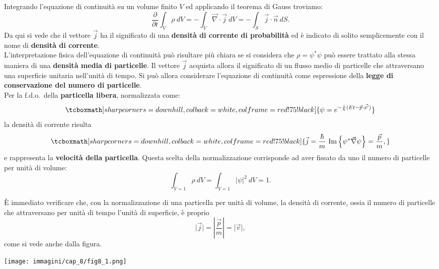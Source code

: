 \documentclass[a4paper,12pt,oneside]{book}
\begin{document}
Integrando l'equazione di continuità su un volume finito $V$ ed applicando il teorema di Gauss troviamo:
\begin{equation}
\frac{\partial }{\partial t} \int _V \rho\ dV = - \int _V \vec{\nabla}\cdot\vec{j}\ dV = -\int _S \vec{j}\cdot\vec{n}\ dS.
\end{equation}
Da qui si vede che il vettore $\vec{j}$ ha il significato di una \textbf{densità di corrente di probabilità} ed è indicato di solito semplicemente con il nome di \textbf{densità di corrente}.\\

L'interpretazione fisica dell'equazione di continuità può risultare più chiara se si considera che $\rho= \psi^* \psi$ può essere trattato alla stessa maniera di una \textbf{densità media di particelle}. Il vettore $\vec{j}$ acquista allora il significato di un flusso medio di particelle che attraversano una superficie unitaria nell'unità di tempo. Si può allora considerare l'equazione di continuità come espressione della \textbf{legge di conservazione del numero di particelle}.\\

Per la f.d.o.~della \textbf{particella libera}, normalizzata come:
	\begin{equation}
		\tcboxmath[sharp corners=downhill, colback=white, colframe=red!75!black]{
			\psi  =  e^{-\frac{i}{\hbar} (Et - \vec{p}\cdot \vec{x'})}
			}
	\end{equation}
la densità di corrente risulta
	\begin{equation}
		\tcboxmath[sharp corners=downhill, colback=white, colframe=red!75!black]{
			\vec{j}= \frac{\hbar}{m}\ \textrm{Im}\left\{\psi ^* \vec{\nabla}\psi \right\}= \frac{\vec{p}}{m},
			}
	\end{equation}
e rappresenta la \textbf{velocità della particella}. Questa scelta della normalizzazione corrisponde ad aver fissato da uno il numero di particelle per unità di volume:
	\begin{equation}
		\int _{V=1} \rho \ dV = \int _{V=1} \vert \psi \vert ^2 \ dV=1.
	\end{equation}
\begin{center}
\begin{tcolorbox}[toprule=3mm, width=.9\textwidth, colback=white]
È immediato verificare che, con la normalizzazione di una particella per unità di volume, la densità di corrente, ossia il numero di particelle che attraversano per unità di tempo l'unità di superficie, è proprio
\begin{equation}
\vert \vec{j} \vert= \left\vert \frac{\vec{p}}{m} \right\vert =\vert \vec{v} \vert ,
\end{equation}
come si vede anche dalla figura.
\begin{center}
\texttt{[image: immagini/cap\_8/fig8\_1.png]}
\end{center}
\end{tcolorbox}
\end{center}
\end{document}

